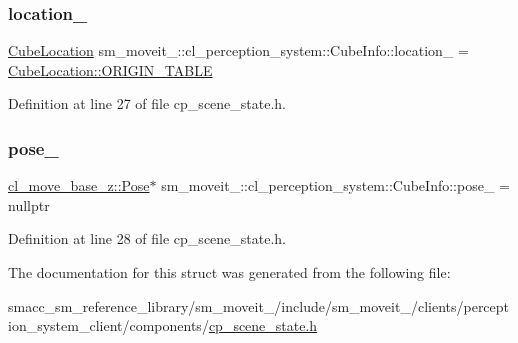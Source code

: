 \subsubsection{\texorpdfstring{location\+\_\+}{location\_}}
{\footnotesize\ttfamily \hyperlink{namespacesm__moveit__4_1_1cl__perception__system_a0d1b8834532a7cf9d19670791eece6d1}{Cube\+Location} sm\+\_\+moveit\+\_\+::cl\+\_\+perception\+\_\+system\+::\+Cube\+Info\+::location\+\_\+ = \hyperlink{namespacesm__moveit__4_1_1cl__perception__system_a0d1b8834532a7cf9d19670791eece6d1ae5ee34c3ef8ec4a46a00a218416c7b1d}{Cube\+Location\+::\+O\+R\+I\+G\+I\+N\+\_\+\+T\+A\+B\+LE}}



Definition at line 27 of file cp\+\_\+scene\+\_\+state.\+h.

\mbox{\label{structsm__moveit__4_1_1cl__perception__system_1_1CubeInfo_aebfbfbef0208c67484c22bf559463db1}} 
\subsubsection{\texorpdfstring{pose\+\_\+}{pose\_}}
{\footnotesize\ttfamily \hyperlink{classcl__move__base__z_1_1Pose}{cl\+\_\+move\+\_\+base\+\_\+z\+::\+Pose}$\ast$ sm\+\_\+moveit\+\_\+::cl\+\_\+perception\+\_\+system\+::\+Cube\+Info\+::pose\+\_\+ = nullptr}



Definition at line 28 of file cp\+\_\+scene\+\_\+state.\+h.



The documentation for this struct was generated from the following file\+:\begin{DoxyCompactItemize}
\item 
smacc\+\_\+sm\+\_\+reference\+\_\+library/sm\+\_\+moveit\+\_/include/sm\+\_\+moveit\+\_/clients/perception\+\_\+system\+\_\+client/components/\hyperlink{cp__scene__state_8h}{cp\+\_\+scene\+\_\+state.\+h}\end{DoxyCompactItemize}
